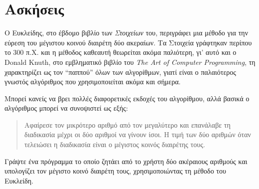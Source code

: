 \documentclass[a4paper,11pt,oneside]{book}
\begin{document}


\section{Ασκήσεις}

\begin{exercise}
Ο Ευκλείδης, στο έβδομο βιβλίο των \emph{Στοιχείων} του, περιγράφει μια μέθοδο για την εύρεση του μέγιστου κοινού διαιρέτη δύο ακεραίων. Τα Στοιχεία γράφτηκαν περίπου το 300 π.Χ. και η μέθοδος καθεαυτή θεωρείται ακόμα παλιότερη, γι' αυτό και ο Donald Knuth, στο εμβληματικό βιβλίο του \emph{The Art of Computer Programming}, τη χαρακτηρίζει ως τον ``παππού'' όλων των αλγορίθμων, γιατί είναι ο παλαιότερος γνωστός αλγόριθμος που χρησιμοποιείται ακόμα και σήμερα.

Μπορεί κανείς να βρει πολλές διαφορετικές εκδοχές του αλγορίθμου, αλλά βασικά ο αλγόριθμος μπορεί να συνοψιστεί ως εξής:
\begin{quote}
Αφαίρεσε τον μικρότερο αριθμό από τον μεγαλύτερο και επανάλαβε τη διαδικασία μέχρι οι δύο αριθμοί να γίνουν ίσοι. Η τιμή των δύο αριθμών όταν τελειώσει η διαδικασία είναι ο μέγιστος κοινός διαιρέτης τους.
\end{quote}
Γράψτε ένα πρόγραμμα το οποίο ζητάει από το χρήστη δύο ακέραιους αριθμούς και υπολογίζει τον μέγιστο κοινό διαιρέτη τους, χρησιμοποιώντας τη μέθοδο του Ευκλείδη.
\end{exercise}
\end{document}
